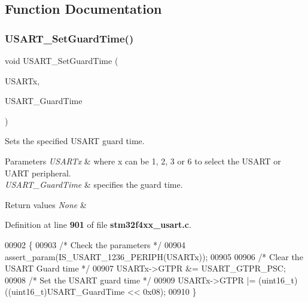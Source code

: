 \subsection{Function Documentation}
\mbox{\label{group__USART__Group6_gac4a35c6acd71ae7e0d67c1f03f0a8777}} 
\subsubsection{U\+S\+A\+R\+T\+\_\+\+Set\+Guard\+Time()}
{\footnotesize\ttfamily void U\+S\+A\+R\+T\+\_\+\+Set\+Guard\+Time (\begin{DoxyParamCaption}\item[{\textbf{ U\+S\+A\+R\+T\+\_\+\+Type\+Def} $\ast$}]{U\+S\+A\+R\+Tx,  }\item[{uint8\+\_\+t}]{U\+S\+A\+R\+T\+\_\+\+Guard\+Time }\end{DoxyParamCaption})}



Sets the specified U\+S\+A\+RT guard time. 


\begin{DoxyParams}{Parameters}
{\em U\+S\+A\+R\+Tx} & where x can be 1, 2, 3 or 6 to select the U\+S\+A\+RT or U\+A\+RT peripheral. \\
\hline
{\em U\+S\+A\+R\+T\+\_\+\+Guard\+Time} & specifies the guard time. \\
\hline
\end{DoxyParams}

\begin{DoxyRetVals}{Return values}
{\em None} & \\
\hline
\end{DoxyRetVals}


Definition at line \textbf{ 901} of file \textbf{ stm32f4xx\+\_\+usart.\+c}.


\begin{DoxyCode}
00902 \{    
00903   \textcolor{comment}{/* Check the parameters */}
00904   assert_param(IS_USART_1236_PERIPH(USARTx));
00905   
00906   \textcolor{comment}{/* Clear the USART Guard time */}
00907   USARTx->GTPR &= USART_GTPR_PSC;
00908   \textcolor{comment}{/* Set the USART guard time */}
00909   USARTx->GTPR |= (uint16\_t)((uint16\_t)USART\_GuardTime << 0x08);
00910 \}
\end{DoxyCode}
\mbox{\label{group__USART__Group6_gabd1347e244c623447151ba3a5e986c5f}} 
